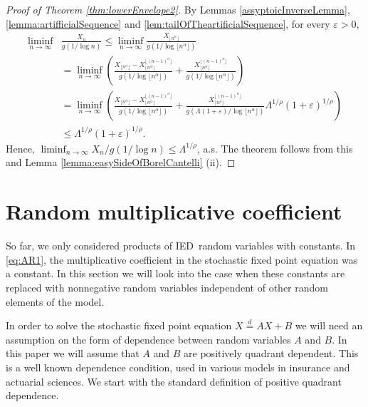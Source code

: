 \documentclass[bj]{imsart}
\numberwithin{equation}{section}
\newcommand{\IGFT}{{\rm IED}}
\newcommand{\1}{\mathbf{1}}
\theoremstyle{definition}
\begin{document}
\begin{proof}[Proof of Theorem \ref{thm:lowerEnvelope2}]
By Lemmas \ref{assyptoicInverseLemma},
\ref{lemma:artifficialSequence} and
 \ref{lem:tailOfTheartificialSequence},  for every $\varepsilon>0$,
\begin{align*}
\liminf_{n\to \infty}&\frac{ X_n}{g(1/\log n)}
\leq \liminf_{n\to \infty} \frac{X_{\lfloor n^\alpha \rfloor}}{g(1/\log  \lfloor n^\alpha \rfloor)}\\
&=
\liminf_{n\to \infty}
\left( \frac{X_{\lfloor n^\alpha \rfloor}-X_{\lfloor n^\alpha \rfloor}^{\lfloor (n-1)^\alpha \rfloor}}{g(1/\log  \lfloor n^\alpha \rfloor)}
+  \frac{X_{\lfloor n^\alpha \rfloor}^{\lfloor (n-1)^\alpha \rfloor}}{g(1/\log   \lfloor n^\alpha \rfloor)} \right)\\
&=
\liminf_{n\to \infty}
\left( \frac{X_{\lfloor n^\alpha \rfloor}-X_{\lfloor n^\alpha \rfloor}^{\lfloor (n-1)^\alpha \rfloor}}{g(1/\log  \lfloor n^\alpha \rfloor)}
+  \frac{X_{\lfloor n^\alpha \rfloor}^{\lfloor (n-1)^\alpha \rfloor}}
{g(\Lambda(1+\varepsilon)/\log   \lfloor n^\alpha \rfloor)} \Lambda^{1/\rho}(1+\varepsilon)^{1/\rho}\right)\\
&\leq \Lambda^{1/\rho}(1+\varepsilon)^{1/\rho}.
\end{align*}
Hence, $\liminf_{n\to \infty}  X_n/g(1/\log n) \leq \Lambda^{1/\rho}$, a.s. 
The theorem follows from this and Lemma \ref{lemma:easySideOfBorelCantelli} (ii). 
\end{proof}

\section{Random multiplicative coefficient}\label{sec:RandomCoefficientIndependent}\rm
So far, we only considered products of \IGFT\ random variables with  constants. In \eqref{eq:AR1}, the multiplicative coefficient 
in the stochastic fixed point equation was a constant. In this section  we will look into the case 
when these constants are replaced with nonnegative random variables independent of other random elements of the model.

In order to solve the stochastic fixed point equation $X\stackrel{d}{=}AX+B$
we will need an assumption on the form of dependence between  random variables $A$ and $B$. In this paper we will assume that $A$ and $B$ are positively quadrant dependent. 
This is a well known dependence condition,
used in various models in insurance and actuarial sciences. We start with the standard definition of positive quadrant dependence. 
\end{document}
